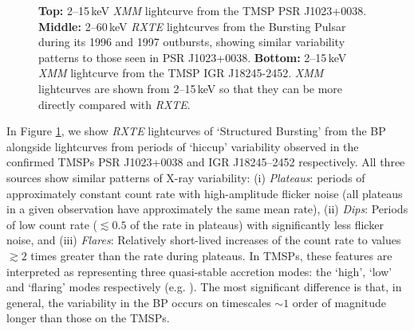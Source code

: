 \begin{figure}
  \centering
  \caption{\small  \textbf{Top:} 2--15\,keV \textit{XMM} lightcurve from the TMSP PSR J1023+0038.  \textbf{Middle:} 2--60\,keV \textit{RXTE} lightcurves from the Bursting Pulsar during its 1996 and 1997 outbursts, showing similar variability patterns to those seen in PSR J1023+0038. \textbf{Bottom:} 2--15\,keV \textit{XMM} lightcurve from the TMSP IGR J18245-2452.  \textit{XMM} lightcurves are shown from 2--15\,keV so that they can be more directly compared with \textit{RXTE}.}
  \label{fig:lcs}
\end{figure}

\par In Figure \ref{fig:lcs}, we show \textit{RXTE} lightcurves of `Structured Bursting' from the BP alongside lightcurves from periods of `hiccup' variability observed in the confirmed TMSPs PSR J1023+0038 and IGR J18245--2452 respectively. All three sources show similar patterns of X-ray variability: 
%
(i) \textit{Plateaus}: periods of approximately constant count rate with high-amplitude flicker noise (all plateaus in a given observation have approximately the same mean rate),
%
(ii) \textit{Dips}: Periods of low count rate ($\lesssim0.5$ of the rate in plateaus) with significantly less flicker noise, and 
%
(iii) \textit{Flares}: Relatively short-lived increases of the count rate to values $\gtrsim2$ times greater than the rate during plateaus.
%
In TMSPs, these features are interpreted as representing three quasi-stable accretion modes: the `high', `low' and `flaring' modes respectively (e.g. \citealp{Bogdanov_TMSPVar}).  The most significant difference is that, in general, the variability in the BP occurs on timescales $\sim1$ order of magnitude longer than those on the TMSPs.

